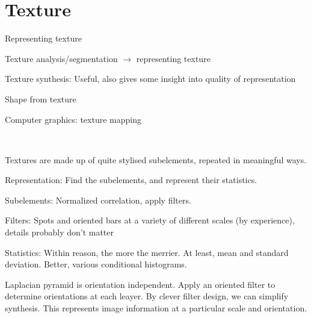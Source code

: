 \setcounter{chapter}{11}
\chapter{Texture}
\begin{compactdesc}
\item[\lp{Key issue}] Representing texture\\
	\begin{enumerate*}[label=\protect\circled{\arabic*},itemjoin=]
		\item Texture analysis/segmentation $\to$ representing texture\\
		\item Texture synthesis: Useful, also gives some insight into quality of representation\\
		\item Shape from texture
	\end{enumerate*}
	Computer graphics: texture mapping
\item[\lp{General}]\hfill \\
	\begin{itemize*}[label=\colorbullet]
		\item Textures are made up of quite stylised subelements, repeated in meaningful ways.\\
		\item Representation: Find the subelements, and represent their statistics.\\
		\item Subelements: Normalized correlation, apply filters.\\
		\item Filters: Spots and oriented bars at a variety of different scales (by experience), details probably don't matter\\
		\item Statistics: Within reason, the more the merrier. At least, mean and standard deviation. Better, various conditional histograms.
	\end{itemize*}
\item[\lp{Oriented pyramids}] Laplacian pyramid is orientation independent. Apply an oriented filter to determine orientations at each leayer. By clever filter design, we can simplify synthesis. This represents image information at a particular scale and orientation.
	\item[\lp{Final texture representation}] \hfill\\
		\begin{enumerate*}[label=\protect\circled{\arabic*},itemjoin=]\hfill\\

\end{enumerate*}
\end{compactdesc}
